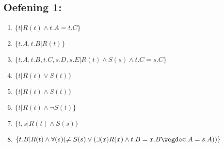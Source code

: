 \documentclass[../Oefenzitting5.tex]{subfiles}
\begin{document}
  \subsection{Oefening 1:}
    \begin{enumerate}[label=\alph*)]
      \item
        $
          \{ t | R(t) \wedge t.A = t.C \}
        $
      \item
        $
          \{ t.A, t.B | R(t) \}
        $
      \item
        $
          \{ t.A, t.B, t.C, s.D, s.E | R(t) \wedge S(s) \wedge t.C = s.C \}
        $
      \item
        $
          \{ t | R(t) \vee S(t)  \}
        $
      \item
        $
          \{ t | R(t) \wedge S(t) \}
        $
      \item
        $
          \{ t | R(t) \wedge \neg S(t) \}
        $
      \item
        $
          \{ t,s | R(t) \wedge S(s) \}
        $
      \item
        $
          \{ t.B | R(t) \wedge \forall(s) (\neq S(s) \vee (\exists(x) R(x) \wedge t.B = x.B \wegde x.A = s.A)) \} 
        $

    \end{enumerate}
\end{document}
